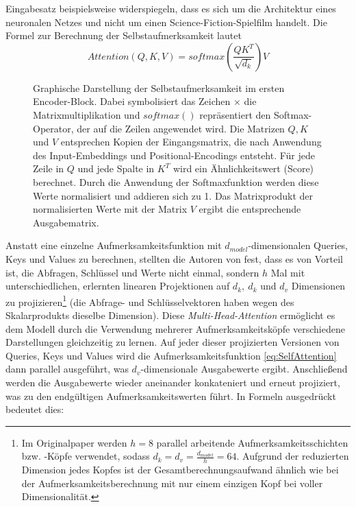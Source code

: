 Eingabesatz beispielsweise widerspiegeln, dass es sich um die Architektur eines neuronalen Netzes und nicht um einen Science-Fiction-Spielfilm handelt. Die Formel zur Berechnung der Selbstaufmerksamkeit lautet \begin{equation}\label{eq:SelfAttention}
	Attention(Q,K,V)=softmax(\frac{QK^T}{\sqrt{d_k}})V
\end{equation}

\begin{figure}
	\centering
	
	\caption{Graphische Darstellung der Selbstaufmerksamkeit im ersten Encoder-Block. Dabei symbolisiert das Zeichen $\times$ die Matrixmultiplikation und $softmax()$ repräsentiert den Softmax-Operator, der auf die Zeilen angewendet wird. Die Matrizen $Q,K$ und $V$ entsprechen Kopien der Eingangsmatrix, die nach Anwendung des Input-Embeddings und Positional-Encodings entsteht. Für jede Zeile in $Q$ und jede Spalte in $K^T$ wird ein Ähnlichkeitswert (Score) berechnet. Durch die Anwendung der Softmaxfunktion werden diese Werte normalisiert und addieren sich zu 1. Das Matrixprodukt der normalisierten Werte mit der Matrix $V$ ergibt die entsprechende Ausgabematrix.}
	\label{Abb:Selfattention}
\end{figure}

Anstatt eine einzelne Aufmerksamkeitsfunktion mit $d_{model}$-dimensionalen Queries, Keys und Values zu berechnen, stellten die Autoren von \cite{Attention_is_all_you_need} fest, dass es von Vorteil ist, die Abfragen, Schlüssel und Werte nicht einmal, sondern $h$ Mal mit unterschiedlichen, erlernten linearen Projektionen auf $d_k,\ d_k$ und $d_v$ Dimensionen zu projizieren\footnote{Im Originalpaper \cite{Attention_is_all_you_need} werden $h=8$ parallel arbeitende Aufmerksamkeitsschichten bzw. -Köpfe verwendet, sodass $d_k=d_v=\frac{d_{model}}{h}=64$. Aufgrund der reduzierten Dimension jedes Kopfes ist der Gesamtberechnungsaufwand ähnlich wie bei der Aufmerksamkeitsberechnung mit nur einem einzigen Kopf bei voller Dimensionalität.} (die Abfrage- und Schlüsselvektoren haben wegen des Skalarprodukts dieselbe Dimension). Diese \emph{Multi-Head-Attention} ermöglicht es dem Modell durch die Verwendung mehrerer Aufmerksamkeitsköpfe verschiedene Darstellungen gleichzeitig zu lernen. Auf jeder dieser projizierten Versionen von Queries, Keys und Values wird die Aufmerksamkeitsfunktion \ref{eq:SelfAttention} dann parallel ausgeführt, was $d_v$-dimensionale Ausgabewerte ergibt. Anschließend werden die Ausgabewerte wieder aneinander konkateniert und erneut projiziert, was zu den endgültigen Aufmerksamkeitswerten führt. In Formeln ausgedrückt bedeutet dies:

